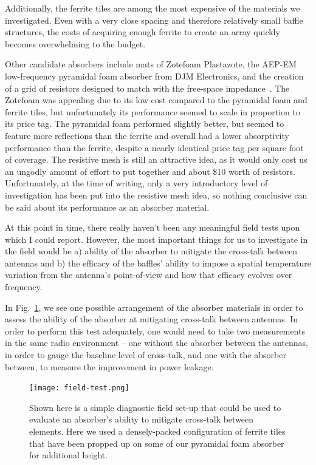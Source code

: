 Additionally, the ferrite tiles are among the most expensive of the materials 
we investigated. Even with a very close spacing and therefore relatively small 
baffle structures, the costs of acquiring enough ferrite to create an array 
quickly becomes overwhelming to the budget.

Other candidate absorbers include mats of Zotefoam Plastazote\textregistered, 
the AEP-EM low-frequency pyramidal foam absorber from DJM Electronics, and the 
creation of a grid of resistors designed to match with the free-space 
impedance~\citep{mahesh2015}. The Zotefoam was appealing due to its low cost 
compared to the pyramidal foam and ferrite tiles, but unfortunately its 
performance seemed to scale in proportion to its price tag.  The pyramidal foam 
performed slightly better, but seemed to feature more reflections than the 
ferrite and overall had a lower absorptivity performance than the ferrite, 
despite a nearly identical price tag per square foot of coverage. The resistive 
mesh is still an attractive idea, as it would only cost us an ungodly amount of 
effort to put together and about \$10 worth of resistors. Unfortunately, at the 
time of writing, only a very introductory level of investigation has been put 
into the resistive mesh idea, so nothing conclusive can be said about its 
performance as an absorber material.

At this point in time, there really haven't been any meaningful field tests 
upon which I could report. However, the most important things for us to 
investigate in the field would be a) ability of the absorber to mitigate the 
cross-talk between antennas and b) the efficacy of the baffles' ability to 
impose a spatial temperature variation from the antenna's point-of-view and how 
that efficacy evolves over frequency.

In Fig.~\ref{fig:field-test}, we see one possible arrangement of the absorber 
materials in order to assess the ability of the absorber at mitigating 
cross-talk between antennas. In order to perform this test adequately, one 
would need to take two measurements in the same radio environment -- one 
without the absorber between the antennas, in order to gauge the baseline level 
of cross-talk, and one with the absorber between, to measure the improvement in 
power leakage.

\begin{figure}
    \begin{center}
    \texttt{[image: field-test.png]}
    \end{center}
    \caption{
        Shown here is a simple diagnostic field set-up that could be used to 
        evaluate an absorber's ability to mitigate cross-talk between elements.  
        Here we used a densely-packed configuration of ferrite tiles that have 
        been propped up on some of our pyramidal foam absorber for additional 
        height.
    }
    \label{fig:field-test}
\end{figure}

